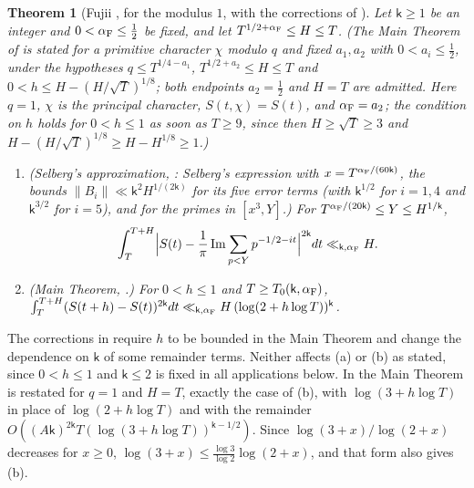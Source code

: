 \documentclass[11pt,a4paper]{article}
\makeatletter
\numberwithin{equation}{section}
\DeclareRobustCommand{\CGcite}[2][]{\if\relax\detokenize{#1}\relax\cite{#2}\else\cite[#1]{#2}\fi}
\newcommand{\CG@getbib}[1]{\@ifundefined{CGBib@#1}{#1}{\csname CGBib@#1\endcsname}}
\DeclareRobustCommand{\CGcite}[2][]{\pdftooltip{\if\relax\detokenize{#1}\relax\cite{#2}\else\cite[#1]{#2}\fi}{\CG@getbib{#2}}}
\newtheorem{theorem}{Theorem}[section]
\theoremstyle{definition}
\theoremstyle{remark}
\makeatother
\begin{document}
\begin{theorem}[{Fujii \CGcite{Fujii1974}, for the modulus $1$, with the corrections of \CGcite[\S5]{Fujii1981}}]\label{thm:known_fujii}
Let $\mathsf k\ge1$ be an integer and $0<\alpha_{\rm F}\le\frac12$ be fixed, and let $T^{1/2+\alpha_{\rm F}}\le H\le T$. (The Main Theorem of \CGcite[p.~225]{Fujii1974} is stated for a primitive character $\chi$ modulo $q$ and fixed $a_1,a_2$ with $0<a_i\le\frac12$, under the hypotheses $q\le T^{1/4-a_1}$, $T^{1/2+a_2}\le H\le T$ and $0<h\le H-(H/\sqrt T)^{1/8}$; both endpoints $a_2=\frac12$ and $H=T$ are admitted. Here $q=1$, $\chi$ is the principal character, $S(t,\chi)=S(t)$, and $\alpha_{\rm F}=a_2$; the condition on $h$ holds for $0<h\le1$ as soon as $T\ge9$, since then $H\ge\sqrt T\ge3$ and $H-(H/\sqrt T)^{1/8}\ge H-H^{1/8}\ge1$.)
\begin{enumerate}[label=(\alph*)]
\item (Selberg's approximation, \CGcite[\S3, pp.~232--233]{Fujii1974}: Selberg's expression with $x=T^{\alpha_{\rm F}/(60\mathsf k)}$, the bounds $\|B_i\|\ll\mathsf k^{2}H^{1/(2\mathsf k)}$ for its five error terms (with $\mathsf k^{1/2}$ for $i=1,4$ and $\mathsf k^{3/2}$ for $i=5$), and \CGcite[Lemma~5]{Fujii1974} for the primes in $[x^3,Y]$.) For $T^{\alpha_{\rm F}/(20\mathsf k)}\le Y\le H^{1/\mathsf k}$,
\begin{equation}
\int_T^{T+H}\Bigl|S(t)-\frac1\pi\operatorname{Im}\sum_{p<Y}p^{-1/2-it}\Bigr|^{2\mathsf k}dt\ll_{\mathsf k,\alpha_{\rm F}}H .
\label{eq:disp_07}
\end{equation}
\item (Main Theorem, \CGcite[p.~225]{Fujii1974}.) For $0<h\le1$ and $T\ge T_0(\mathsf k,\alpha_{\rm F})$, $\int_T^{T+H}(S(t+h)-S(t))^{2\mathsf k}dt\ll_{\mathsf k,\alpha_{\rm F}}H\,(\log(2+h\log T))^{\mathsf k}$.
\end{enumerate}
\end{theorem}
The corrections in \CGcite[\S5]{Fujii1981} require $h$ to be bounded in the Main Theorem and change the dependence on $\mathsf k$ of some remainder terms. Neither affects (a) or (b) as stated, since $0<h\le1$ and $\mathsf k\le2$ is fixed in all applications below. In \CGcite[\S1, ($\alpha$)]{Fujii1981} the Main Theorem is restated for $q=1$ and $H=T$, exactly the case of (b), with $\log(3+h\log T)$ in place of $\log(2+h\log T)$ and with the remainder $O((A\mathsf k)^{2\mathsf k}T(\log(3+h\log T))^{\mathsf k-1/2})$. Since $\log(3+x)/\log(2+x)$ decreases for $x\ge0$, $\log(3+x)\le\frac{\log3}{\log2}\log(2+x)$, and that form also gives (b).
\end{document}
